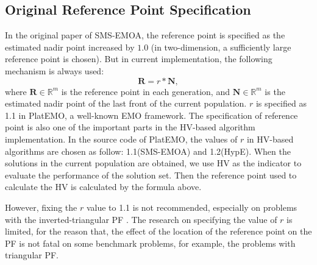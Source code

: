\documentclass[conference]{IEEEtran}
\begin{document}
\subsection{Original Reference Point Specification}
In the original paper of SMS-EMOA\cite{smsemoa}, 
the reference point is specified as the estimated nadir point increased by $\boldsymbol{1.0}$
(in two-dimension, a sufficiently large reference point is chosen). 
But in current implementation, the following mechanism is always used:
\begin{equation}\label{frpa1}
  \boldsymbol R = r * \boldsymbol N,  
\end{equation}
where $\boldsymbol R \in \mathbb{R}^m$ is the reference point in each generation, 
and $\boldsymbol N \in \mathbb{R}^m$ is the estimated nadir point of the last front of the current population. 
$r$ is specified as 1.1 in PlatEMO\cite{PlatEMO}, a well-known EMO framework. 
The specification of reference point is also one of the important parts in the HV-based algorithm implementation.
In the source code of PlatEMO, the values of $r$ in HV-based algorithms are chosen as follow: 
1.1(SMS-EMOA\cite{smsemoa}) and 1.2(HypE\cite{HypE}). %
When the solutions in the current population are obtained, 
we use HV as the indicator to evaluate the performance of the solution set. 
Then the reference point used to calculate the HV is calculated by the formula above. 

However, fixing the $r$ value to 1.1 is not recommended, especially on problems with the inverted-triangular PF
\cite{hisao:RPhowtoSpecify}. 
The research on specifying the value of $r$ is limited, for the reason that, 
the effect of the location of the reference point on the PF 
is not fatal on some benchmark problems, for example, the problems with triangular PF. 

%
\end{document}
